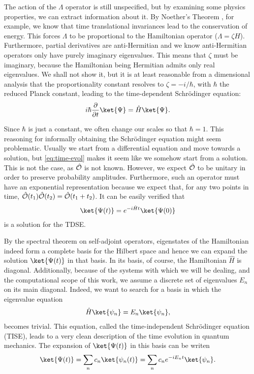 The action of the $\Lambda$ operator is still unspecified, but by examining some physics properties, we can extract information about it. By Noether's Theorem \cite{noether1983invariante}, for example, we know that time translational invariances lead to the conservation of energy. This forces $\Lambda$ to be proportional to the Hamiltonian operator ($\Lambda = \zeta H$). Furthermore, partial derivatives are anti-Hermitian and we know anti-Hermitian operators only have purely imaginary eigenvalues. This means that $\zeta$ must be imaginary, because the Hamiltonian being Hermitian admits only real eigenvalues. We shall not show it, but it is at least reasonable from a dimensional analysis that the proportionality constant resolves to $\zeta = -i/\hbar$, with $\hbar$ the reduced Planck constant, leading to the time-dependent Schrödinger equation: 
\begin{align*}
    i\hbar \frac{\partial}{\partial t} \ket{\Psi} = \hat{H} \ket{\Psi}.
\end{align*}

Since $\hbar$ is just a constant, we often change our scales so that $\hbar = 1$. This reasoning for informally obtaining the Schrödinger equation might seem problematic. Usually we start from a differential equation and move towards a solution, but \eqref{eq:time-evol} makes it seem like we somehow start from a solution. This is not the case, as $\hat{\mathcal{O}}$ is not known. However, we expect $\hat{\mathcal{O}}$ to be unitary in order to preserve probability amplitudes. Furthermore, such an operator must have an exponential representation because we expect that, for any two points in time, $\hat{\mathcal{O}}(t_1)\hat{\mathcal{O}}(t_2) = \hat{\mathcal{O}}(t_1 + t_2)$. It can be easily verified that 
\begin{align}
    \ket{\Psi(t)} = e^{-i\hat{H}t}\ket{\Psi(0)}
    \label{eq:sol_tdse}
\end{align}
is a solution for the TDSE.

By the spectral theorem on self-adjoint operators, 
eigenstates of the Hamiltonian indeed form a complete basis for the Hilbert space and hence we can expand the solution $\ket{\Psi(t)}$ in that basis. In its basis, of course, the Hamiltonian $\hat{H}$ is diagonal. Additionally, because of the systems with which we will be dealing, and the computational scope of this work, we assume a discrete set of eigenvalues $E_n$ on its main diagonal. Indeed, we want to search for a basis in which the eigenvalue equation
\begin{align}
    \hat{H} \ket{\psi_n} = E_n \ket{\psi_n},
    \label{eq:TISE}
\end{align}
becomes trivial. This equation, called the time-independent Schrödinger equation (TISE), leads to a very clean description of the time evolution in quantum mechanics. The expansion of $\ket{\Psi(t)}$ in this basis can be writen
\begin{align*}
    \ket{\Psi(t)} = \sum_n c_n \ket{\psi_n{(t)}} = \sum_n c_n e^{-iE_n t} \ket{\psi_n}.
\end{align*}

